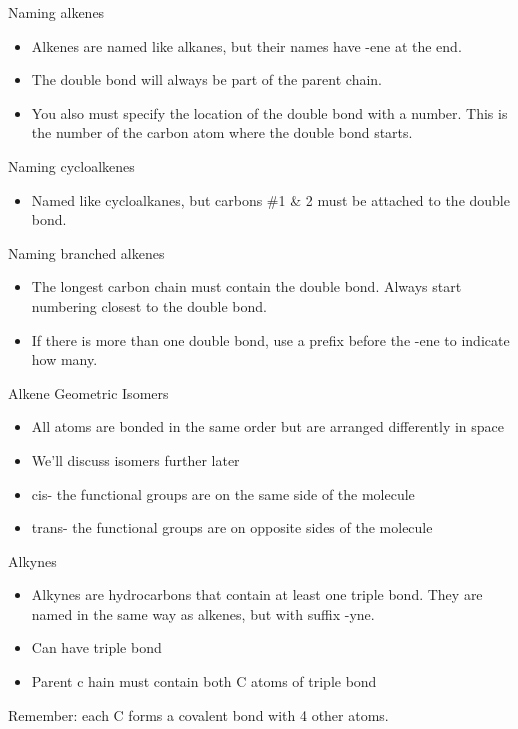 \documentclass[../hchem.tex]{subfiles}
\begin{document}
Naming alkenes 
\begin{itemize}
    \item Alkenes are named like alkanes, but their names have -ene at the end.
    \item The double bond will always be part of the parent chain.
    \item You also must specify the location of the double bond with a number. This is the number of the carbon atom where the double bond starts.
\end{itemize}

Naming cycloalkenes 
\begin{itemize}
    \item Named like cycloalkanes, but carbons \#1 \& 2 must be attached to the double bond.
\end{itemize}

Naming branched alkenes 
\begin{itemize}
    \item The longest carbon chain must contain the double bond. Always start numbering closest to the double bond.
    \item If there is more than one double bond, use a prefix before the -ene to indicate how many.
\end{itemize}

Alkene Geometric Isomers 
\begin{itemize}
    \item All atoms are bonded in the same order but are arranged differently in space 
    \item We'll discuss isomers further later 
    \item cis- the functional groups are on the same side of the molecule 
    \item trans- the functional groups are on opposite sides of the molecule 
\end{itemize}

Alkynes 
\begin{itemize}
    \item Alkynes are hydrocarbons that contain at least one triple bond. They are named in the same way as alkenes, but with suffix -yne.
    \item Can have  triple bond 
    \item Parent c hain must contain both C atoms of triple bond 
\end{itemize}

Remember: each C forms a covalent bond with 4 other atoms.
\end{document}
